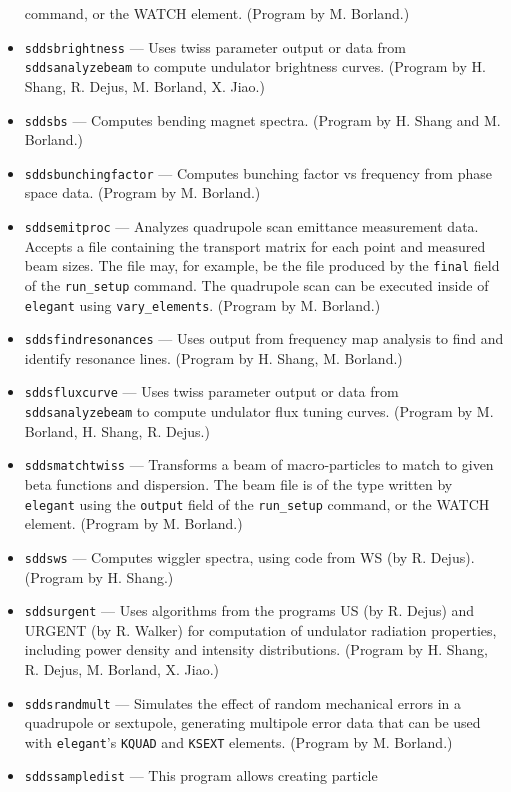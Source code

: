 \documentclass[11pt]{article}
\begin{document}
\begin{itemize}
        command, or the WATCH element.  (Program by M. Borland.)
\item {\tt sddsbrightness} --- Uses twiss parameter output or data from {\tt sddsanalyzebeam} to
  compute undulator brightness curves.  (Program by H. Shang, R. Dejus, M. Borland, X. Jiao.)
\item {\tt sddsbs} --- Computes bending magnet spectra.
  (Program by H. Shang and M. Borland.)
\item {\tt sddsbunchingfactor} --- Computes bunching factor vs frequency from phase space data.
  (Program by M. Borland.)
\item {\tt sddsemitproc} --- Analyzes quadrupole scan emittance measurement data.  Accepts a
        file containing the transport matrix for each point and measured beam sizes.  
        The file may, for example, be the file produced
        by the {\tt final} field of the {\tt run\_setup} command.  The quadrupole scan can be
        executed inside of {\tt elegant} using {\tt vary\_elements}. (Program by M. Borland.)
\item {\tt sddsfindresonances} --- Uses output from frequency map analysis to find and identify resonance lines.
 (Program by H. Shang, M. Borland.)
\item {\tt sddsfluxcurve} --- Uses twiss parameter output or data from {\tt sddsanalyzebeam} to
  compute undulator flux tuning curves.  (Program by M. Borland, H. Shang, R. Dejus.)
\item {\tt sddsmatchtwiss} --- Transforms a beam of macro-particles to match to given beta
        functions and dispersion.    The beam file
        is of the type written by {\tt elegant} using the {\tt output} field of the {\tt run\_setup}
        command, or the WATCH element. (Program by M. Borland.)
\item {\tt sddsws} --- Computes wiggler spectra, using code from WS (by R. Dejus).
  (Program by H. Shang.)
\item {\tt sddsurgent} --- Uses algorithms from the programs US (by R. Dejus) and URGENT (by R. Walker) for computation of undulator
  radiation properties, including power density and intensity distributions.  (Program by H. Shang, R. Dejus, M. Borland, X. Jiao.)
\item {\tt sddsrandmult} --- Simulates the effect of random mechanical errors in a quadrupole or sextupole,
  generating multipole error data that can be used with {\tt elegant}'s {\tt KQUAD} and {\tt KSEXT}
  elements. (Program by M. Borland.)
\item {\tt sddssampledist} --- This program allows creating particle

\end{itemize}
\end{document}
